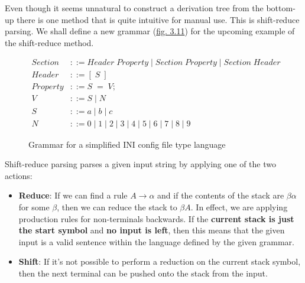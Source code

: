 
Even though it seems unnatural to construct a derivation tree from the bottom-up there is one method that is quite intuitive for manual use. This is shift-reduce parsing. We shall define a new grammar (\hyperref[fig:3.11]{fig. 3.11}) for the upcoming example of the shift-reduce method.

\begin{figure}[h]
    \begin{center}
        \begin{equation}
            \begin{split}
                Section &::= Header\;Property\;|\;Section\;Property\;|\;Section\;Header\\
                Header &::= [\;S\;]\\
                Property &::= S\;=\;V;\\
                V &::= S\;|\;N\\
                S &::= a\;|\;b\;|\;c\\
                N &::= 0\;|\;1\;|\;2\;|\;3\;|\;4\;|\;5\;|\;6\;|\;7\;|\;8\;|\;9
            \end{split}
            \nonumber
        \end{equation}
    \end{center}
    \vspace{-1em}
    \caption{\label{fig:3.11}Grammar for a simplified INI config file type language}
\end{figure}

\pagebreak

Shift-reduce parsing parses a given input string by applying one of the two actions:

\begin{itemize}
    \item \textbf{Reduce}: If we can find a rule $A \rightarrow \alpha$ and if the contents of the stack are $\beta\alpha$ for some $\beta$, then we can reduce the stack to $\beta A$. In effect, we are applying production rules for non-terminals backwards. If the \textbf{current stack is just the start symbol} and \textbf{no input is left}, then this means that the given input is a valid sentence within the language defined by the given grammar.
    \item \textbf{Shift}: If it's not possible to perform a reduction on the current stack symbol, then the next terminal can be pushed onto the stack from the input.
\end{itemize}

